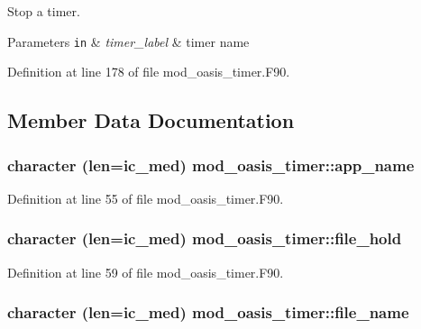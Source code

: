 Stop a timer. 


\begin{DoxyParams}[1]{Parameters}
\mbox{\tt in}  & {\em timer\+\_\+label} & timer name \\
\hline
\end{DoxyParams}


Definition at line 178 of file mod\+\_\+oasis\+\_\+timer.\+F90.



\subsection{Member Data Documentation}
\hypertarget{classmod__oasis__timer_ad73dfe7213bbfab6212b9617000f4ce3}{
\subsubsection[{app\+\_\+name}]{\setlength{\rightskip}{0pt plus 5cm}character (len=ic\+\_\+med) mod\+\_\+oasis\+\_\+timer\+::app\+\_\+name\hspace{0.3cm}{\ttfamily [private]}}}\label{classmod__oasis__timer_ad73dfe7213bbfab6212b9617000f4ce3}


Definition at line 55 of file mod\+\_\+oasis\+\_\+timer.\+F90.

\hypertarget{classmod__oasis__timer_a25a9f5f978c475475b48d782c4ad279c}{
\subsubsection[{file\+\_\+hold}]{\setlength{\rightskip}{0pt plus 5cm}character (len=ic\+\_\+med) mod\+\_\+oasis\+\_\+timer\+::file\+\_\+hold\hspace{0.3cm}{\ttfamily [private]}}}\label{classmod__oasis__timer_a25a9f5f978c475475b48d782c4ad279c}


Definition at line 59 of file mod\+\_\+oasis\+\_\+timer.\+F90.

\hypertarget{classmod__oasis__timer_a12dc3f95f8178d2ea46037a33da0e823}{
\subsubsection[{file\+\_\+name}]{\setlength{\rightskip}{0pt plus 5cm}character (len=ic\+\_\+med) mod\+\_\+oasis\+\_\+timer\+::file\+\_\+name\hspace{0.3cm}{\ttfamily [private]}}}\label{classmod__oasis__timer_a12dc3f95f8178d2ea46037a33da0e823}



